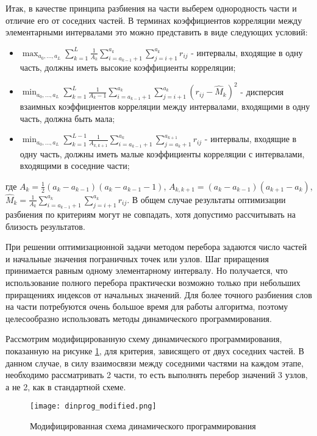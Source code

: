 Итак, в качестве принципа разбиения на части выберем однородность части и отличие его от соседних частей.
В терминах коэффициентов корреляции между элементарными интервалами это можно представить в виде следующих условий:
\begin{itemize}[leftmargin=.15in]
	\item $\max_{a_0, \dots, a_L} \sum_{k=1}^{L} \frac{1}{A_k} \sum^{a_k}_{i=a_{k-1}+1} \sum^{a_k}_{j=i+1} r_{ij}$ - интервалы, входящие в одну часть, должны иметь высокие коэффициенты корреляции;
	\item $\min_{a_0, \dots, a_L} \sum_{k=1}^{L} \frac{1}{A_k-1} \sum^{a_k}_{i=a_{k-1}+1} \sum^{a_k}_{j=i+1} (r_{ij} - \widehat{M}_k)^2$ - дисперсия взаимных коэффициентов корреляции между интервалами, входящими в одну часть, должна быть мала;
	\item $\min_{a_0, \dots, a_L} \sum_{k=1}^{L-1} \frac{1}{A_{k,k+1}} \sum^{a_k}_{i=a_{k-1}+1} \sum^{a_{k+1}}_{j=a_k+1} r_{ij}$ - интервалы, входящие в одну часть, должны иметь малые коэффициенты корреляции с интервалами, входящими в соседние части;
\end{itemize}
где $A_k = \frac{1}{2} (a_k - a_{k-1})(a_k - a_{k-1} - 1)$, $A_{k,k+1} = (a_k - a_{k-1}) (a_{k+1} - a_k)$, $\widehat{M}_k = \frac{1}{A_k} \sum^{a_k}_{i=a_{k-1}+1} \sum^{a_k}_{j=i+1} r_{ij}$.
В общем случае результаты оптимизации разбиения по критериям могут не совпадать, хотя допустимо рассчитывать на близость результатов.

При решении оптимизационной задачи методом перебора задаются число частей и начальные значения пограничных точек или узлов.
Шаг приращения принимается равным одному элементарному интервалу.
Но получается, что использование полного перебора практически возможно только при небольших приращениях индексов от начальных значений.
Для более точного разбиения слов на части потребуются очень большое время для работы алгоритма, поэтому целесообразно использовать методы динамического программирования.

Рассмотрим модифицированную схему динамического программирования, показанную на рисунке \ref{fig:2_2}, для критерия, зависящего от двух соседних частей.
В данном случае, в силу взаимосвязи между соседними частями на каждом этапе, необходимо рассматривать 2 части, то есть выполнять перебор значений 3 узлов, а не 2, как в стандартной схеме.
\begin{figure}[h]
	\centering
	\texttt{[image: dinprog\_modified.png]}
	\caption{Модифицированная схема динамического программирования}
	\label{fig:2_2}
\end{figure}

